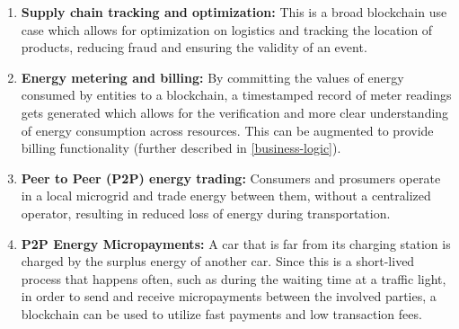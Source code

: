 \begin{enumerate}
    \item \textbf{Supply chain tracking and optimization:} This is a broad blockchain use case which allows for optimization on logistics and tracking the location of products, reducing fraud and ensuring the validity of an event.
    \item \textbf{Energy metering and billing:} By committing the values of energy consumed by entities to a blockchain, a timestamped record of meter readings gets generated which allows for the verification and more clear understanding of energy consumption across resources. This can be augmented to provide billing functionality (further described in \ref{business-logic}).
    \item \textbf{Peer to Peer (P2P) energy trading:} Consumers and prosumers operate in a local microgrid and trade energy between them, without a centralized operator, resulting in reduced loss of energy during transportation.
    \item \textbf{P2P Energy Micropayments:} A car that is far from its charging station is charged by the surplus energy of another car. Since this is a short-lived process that happens often, such as during the waiting time at a traffic light, in order to send and receive micropayments between the involved parties, a blockchain can be used to utilize fast payments and low transaction fees. 
\end{enumerate}





